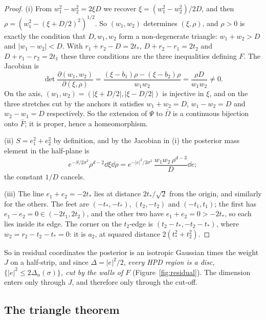 \begin{proof}
(i) From $w_1^2 - w_2^2 = 2\xi D$ we recover $\xi = (w_1^2 - w_2^2)/2D$, and then $\rho = (w_1^2 - (\xi + D/2)^2)^{1/2}$.
So $(w_1, w_2)$ determines $(\xi, \rho)$, and $\rho > 0$ is exactly the condition that $D, w_1, w_2$ form a
non-degenerate triangle: $w_1 + w_2 > D$ and $|w_1 - w_2| < D$. With $r_1 + r_2 - D = 2t_*$, $D + r_2 - r_1 = 2t_2$ and
$D + r_1 - r_2 = 2t_1$ these three conditions are the three inequalities defining $F$. The Jacobian is
\[ \det\frac{\partial(w_1, w_2)}{\partial(\xi, \rho)}
   = \frac{(\xi - b_1)\rho - (\xi - b_2)\rho}{w_1 w_2} = \frac{\rho D}{w_1 w_2} \ne 0 . \]
On the axis, $(w_1, w_2) = (|\xi + D/2|, |\xi - D/2|)$ is injective in $\xi$, and on the three stretches cut by the anchors
it satisfies $w_1 + w_2 = D$, $w_1 - w_2 = D$ and $w_2 - w_1 = D$ respectively. So the extension of $\Psi$ to $\bar\Omega$ is a
continuous bijection onto $\bar F$; it is proper, hence a homeomorphism.

(ii) $S = e_1^2 + e_2^2$ by definition, and by the Jacobian in (i) the posterior mass element in the half-plane is
\[ e^{-S/2\sigma^2}\rho^{d-2}\dd\xi\dd\rho = e^{-|e|^2/2\sigma^2}\,\frac{w_1w_2\,\rho^{d-3}}{D}\dd e ; \]
the constant $1/D$ cancels.

(iii) The line $e_1 + e_2 = -2t_*$ lies at distance $2t_*/\sqrt2$ from the origin, and similarly for the others. The feet
are $(-t_*, -t_*)$, $(t_2, -t_2)$ and $(-t_1, t_1)$; the first has $e_1 - e_2 = 0 \in (-2t_1, 2t_2)$, and the other two
have $e_1 + e_2 = 0 > -2t_*$, so each lies inside its edge. The corner on the $t_2$-edge is
$(t_2 - t_*, -t_2 - t_*)$, where $w_2 = r_2 - t_2 - t_* = 0$: it is $a_2$, at squared distance $2(t_*^2 + t_2^2)$.
\end{proof}

So in residual coordinates the posterior is an isotropic Gaussian times the weight $J$ on a half-strip, and since
$\Delta = |e|^2/2$, \emph{every HPD region is a disc, $\{|e|^2 \le 2\Delta_\alpha(\sigma)\}$, cut by the walls of $F$}
(Figure~\ref{fig:residual}). The dimension enters only through $J$, and therefore only through the cut-off.


\subsection{The triangle theorem}

